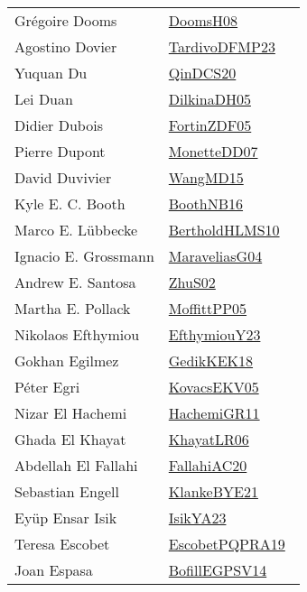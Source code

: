 {\begin{longtable}{p{4cm}p{20cm}}
Gr{\'{e}}goire Dooms & \href{works/DoomsH08.pdf}{DoomsH08}~\cite{DoomsH08}\\
Agostino Dovier & \href{works/TardivoDFMP23.pdf}{TardivoDFMP23}~\cite{TardivoDFMP23}\\
Yuquan Du & \href{works/QinDCS20.pdf}{QinDCS20}~\cite{QinDCS20}\\
Lei Duan & \href{works/DilkinaDH05.pdf}{DilkinaDH05}~\cite{DilkinaDH05}\\
Didier Dubois & \href{works/FortinZDF05.pdf}{FortinZDF05}~\cite{FortinZDF05}\\
Pierre Dupont & \href{works/MonetteDD07.pdf}{MonetteDD07}~\cite{MonetteDD07}\\
David Duvivier & \href{works/WangMD15.pdf}{WangMD15}~\cite{WangMD15}\\
Kyle E. C. Booth & \href{works/BoothNB16.pdf}{BoothNB16}~\cite{BoothNB16}\\
Marco E. L{\"{u}}bbecke & \href{works/BertholdHLMS10.pdf}{BertholdHLMS10}~\cite{BertholdHLMS10}\\
Ignacio E. Grossmann & \href{works/MaraveliasG04.pdf}{MaraveliasG04}~\cite{MaraveliasG04}\\
Andrew E. Santosa & \href{works/ZhuS02.pdf}{ZhuS02}~\cite{ZhuS02}\\
Martha E. Pollack & \href{works/MoffittPP05.pdf}{MoffittPP05}~\cite{MoffittPP05}\\
Nikolaos Efthymiou & \href{works/EfthymiouY23.pdf}{EfthymiouY23}~\cite{EfthymiouY23}\\
Gokhan Egilmez & \href{works/GedikKEK18.pdf}{GedikKEK18}~\cite{GedikKEK18}\\
P{\'{e}}ter Egri & \href{works/KovacsEKV05.pdf}{KovacsEKV05}~\cite{KovacsEKV05}\\
Nizar El Hachemi & \href{works/HachemiGR11.pdf}{HachemiGR11}~\cite{HachemiGR11}\\
Ghada El Khayat & \href{works/KhayatLR06.pdf}{KhayatLR06}~\cite{KhayatLR06}\\
Abdellah El Fallahi & \href{}{FallahiAC20}~\cite{FallahiAC20}\\
Sebastian Engell & \href{works/KlankeBYE21.pdf}{KlankeBYE21}~\cite{KlankeBYE21}\\
Ey{\"{u}}p Ensar Isik & \href{works/IsikYA23.pdf}{IsikYA23}~\cite{IsikYA23}\\
Teresa Escobet & \href{works/EscobetPQPRA19.pdf}{EscobetPQPRA19}~\cite{EscobetPQPRA19}\\
Joan Espasa & \href{works/BofillEGPSV14.pdf}{BofillEGPSV14}~\cite{BofillEGPSV14}\\

\end{longtable}}
